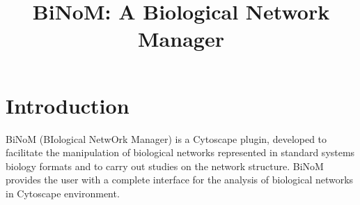 \documentclass[11pt]{article}
\begin{document}
\begin{titlepage}
 
\vspace*{\fill}
\begin{figure}[h]
\end{figure}
\vspace*{\fill}

\newpage

\title{\huge{\textbf{BiNoM: A Biological Network Manager}}}
\date{}
\author{}
\maketitle

\vspace{4 cm}
\vspace{4 cm}


\end{titlepage}

\tableofcontents
\newpage

\section{Introduction}
BiNoM (BIological NetwOrk Manager) is a Cytoscape plugin, developed to
facilitate the manipulation of biological networks represented in standard
systems biology formats and to carry out studies on the network structure. BiNoM
provides the user with a complete interface for the analysis of biological
networks in Cytoscape environment.\\
\end{document}

